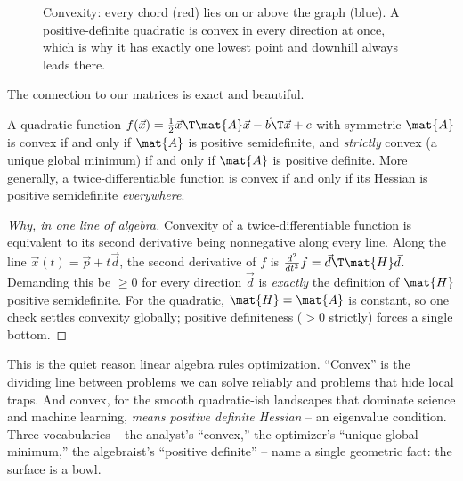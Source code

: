 \begin{figure}[H]
\centering
{}
\caption{Convexity: every chord (red) lies on or above the graph (blue). A
positive-definite quadratic is convex in every direction at once, which is why it has
exactly one lowest point and downhill always leads there.}
\label{ch36:fig-convex}
\end{figure}

The connection to our matrices is exact and beautiful.

\begin{theorem}
\label{ch36:thm-convex}
A quadratic function $f(\vec{x})=\tfrac12\vec{x}\T\mat{A}\vec{x} - \vec{b}\T\vec{x}+c$
with symmetric $\mat{A}$ is convex if and only if $\mat{A}$ is positive
semidefinite, and \emph{strictly} convex (a unique global minimum) if and only if
$\mat{A}$ is positive definite. More generally, a twice-differentiable function is
convex if and only if its Hessian is positive semidefinite \emph{everywhere}.
\end{theorem}

\begin{proof}[Why, in one line of algebra]
Convexity of a twice-differentiable function is equivalent to its second derivative
being nonnegative along every line. Along the line $\vec{x}(t)=\vec{p}+t\vec{d}$, the
second derivative of $f$ is $\frac{d^2}{dt^2}f = \vec{d}\T\mat{H}\vec{d}$. Demanding
this be $\ge 0$ for every direction $\vec{d}$ is \emph{exactly} the definition of
$\mat{H}$ positive semidefinite. For the quadratic, $\mat{H}=\mat{A}$ is constant, so
one check settles convexity globally; positive definiteness ($>0$ strictly) forces a
single bottom.
\end{proof}

\begin{aestheticbox}
This is the quiet reason linear algebra rules optimization. ``Convex'' is the
dividing line between problems we can solve reliably and problems that hide local
traps. And convex, for the smooth quadratic-ish landscapes that dominate science and
machine learning, \emph{means positive definite Hessian} -- an eigenvalue condition.
Three vocabularies -- the analyst's ``convex,'' the optimizer's ``unique global
minimum,'' the algebraist's ``positive definite'' -- name a single geometric fact:
the surface is a bowl.
\end{aestheticbox}

